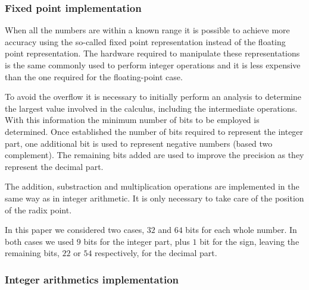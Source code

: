 \subsubsection{Fixed point implementation}
\label{sec:impleFix}

When all the numbers are within a known range it is possible to achieve more accuracy using the so-called fixed point representation instead of the floating point representation.
The hardware required to manipulate these representations is the same commonly used to perform integer operations and it is less expensive than the one required for the floating-point case.

To avoid the overflow it is necessary to initially perform an analysis to determine the largest value involved in the calculus, including the intermediate operations.
With this information the minimum number of bits to be employed is determined.
Once established the number of bits required to represent the integer part, one additional bit is used to represent negative numbers (based two complement).
The remaining bits added are used to improve the precision as they represent the decimal part.

The addition, substraction and multiplication operations are implemented in the same way as in integer arithmetic.
It is only necessary to take care of the position of the radix point.

In this paper we considered two cases, $32$ and $64$ bits for each whole number.
In both cases we used $9$ bits for the integer part, plus $1$ bit for the sign, leaving the remaining bits, $22$ or $54$ respectively, for the decimal part.

\subsubsection{Integer arithmetics implementation}
\label{sec:impleInt}

